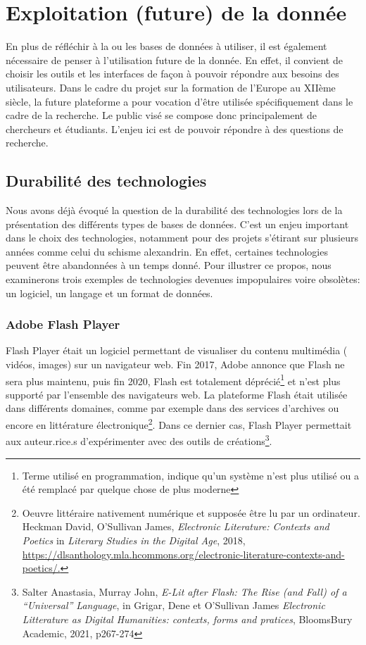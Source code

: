     \chapter{Exploitation (future) de la donnée}

En plus de réfléchir à la ou les bases de données à utiliser, il est également nécessaire de penser à l’utilisation future de la donnée. En effet, il convient de choisir les outils et les interfaces de façon à pouvoir répondre aux besoins des utilisateurs. Dans le cadre du projet sur la formation de l’Europe au XIIème siècle, la future plateforme a pour vocation d’être utilisée spécifiquement dans le cadre de la recherche. Le public visé se compose donc principalement de chercheurs et étudiants. L’enjeu ici est de pouvoir répondre à des questions de recherche.



    \section{Durabilité des technologies}

Nous avons déjà évoqué la question de la durabilité des technologies lors de la présentation des différents types de bases de données. C’est un enjeu important dans le choix des technologies, notamment pour des projets s’étirant sur plusieurs années comme celui du schisme alexandrin.
En effet, certaines technologies peuvent être abandonnées à un temps donné. Pour illustrer ce propos, nous examinerons trois exemples de technologies devenues impopulaires voire obsolètes: un logiciel, un langage et un format de données.

    \subsection{Adobe Flash Player}
    
Flash Player était un logiciel permettant de visualiser du contenu multimédia ( vidéos, images) sur un navigateur web. Fin 2017, Adobe annonce que Flash ne sera plus maintenu, puis fin 2020, Flash est totalement déprécié\footnote{Terme utilisé en programmation, indique qu'un système n'est plus utilisé ou a été remplacé par quelque chose de plus moderne} et n’est plus supporté par l’ensemble des navigateurs web.
La plateforme Flash était utilisée dans différents domaines, comme par exemple dans des services d’archives ou encore en littérature électronique\footnote{Oeuvre littéraire nativement numérique et supposée être lu par un ordinateur. Heckman David, O’Sullivan James, \textit{Electronic Literature: Contexts and Poetics} in \textit{Literary Studies in the Digital Age}, 2018, \url{https://dlsanthology.mla.hcommons.org/electronic-literature-contexts-and-poetics/.}}. Dans ce dernier cas, Flash Player permettait aux auteur.rice.s d’expérimenter avec des outils de créations\footnote{Salter Anastasia, Murray John, \textit{E-Lit after Flash: The Rise (and Fall) of a “Universal” Language}, in Grigar, Dene et O’Sullivan James \textit{Electronic Litterature as Digital Humanities: contexts, forms and pratices}, BloomsBury Academic, 2021, p267-274}. 


